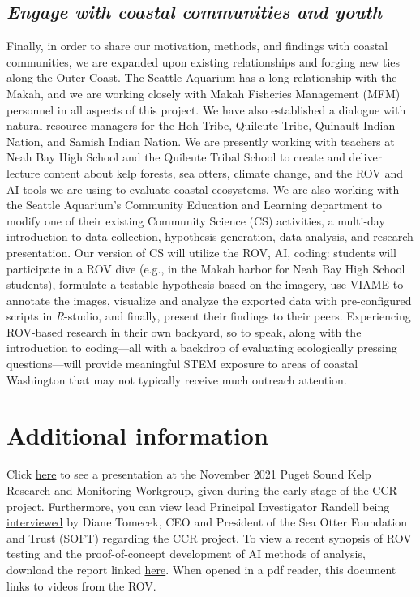 \documentclass[11pt]{article}
\begin{document}
\subsection{\textit{Engage with coastal communities and youth}}
Finally, in order to share our motivation, methods, and findings with 
coastal communities, we are expanded upon existing relationships 
and forging new ties along the Outer Coast. 
The Seattle Aquarium has a long relationship with the Makah, and we are 
working closely with Makah Fisheries Management (MFM) personnel in all 
aspects of this project. 
We have also established a dialogue with natural resource managers for 
the Hoh Tribe, Quileute Tribe, Quinault Indian Nation, and Samish 
Indian Nation. 
We are presently working with teachers at Neah Bay High School and the 
Quileute Tribal School to create and deliver lecture content about kelp 
forests, sea otters, climate change, and the ROV and AI tools we are 
using to evaluate coastal ecosystems.
We are also working with the Seattle Aquarium's Community Education and 
Learning department to modify one of their existing Community Science 
(CS) activities, a multi-day introduction to data collection, 
hypothesis generation, data analysis, and research presentation.
Our version of CS will utilize the ROV, AI, coding: students will 
participate in a ROV dive (e.g., in the Makah harbor for Neah Bay High 
School students),
formulate a testable hypothesis based on the imagery, 
use VIAME to annotate the images,
visualize and analyze the exported data with pre-configured scripts in 
\textit{R}-studio, and finally, present their findings to their peers. 
Experiencing ROV-based research in their own backyard, so to speak, 
along with the introduction to coding---all with a backdrop of 
evaluating ecologically pressing questions---will provide meaningful 
STEM exposure to areas of coastal Washington that may not typically 
receive much outreach attention. 



\section{Additional information}
\label{Additional information}
Click \href{https://www.youtube.com/watch?v=q3xT6H-Ufks\&t=1702s}{here} 
to see a presentation at the November 2021 Puget Sound Kelp Research 
and 
Monitoring Workgroup, given during the early stage of the CCR project. 
Furthermore, you can view lead Principal Investigator Randell being 
\href{https://www.youtube.com/watch?v=KDEc3Q2V5XQ\&ab_channel=SeaOtterFoundation\%26Trust}{interviewed}
 by Diane Tomecek, CEO and President of the Sea Otter 
Foundation and Trust (SOFT) regarding the CCR project. 
To view a recent synopsis of ROV testing and the proof-of-concept 
development of AI methods of analysis, download the report linked 
\href{https://drive.google.com/file/d/1PeGnilFcc_J5Gx2AwyMfiZZa_116hup7/view?usp=sharing}{here}.
When opened in a pdf reader, this document links to videos from the ROV.
\end{document}
